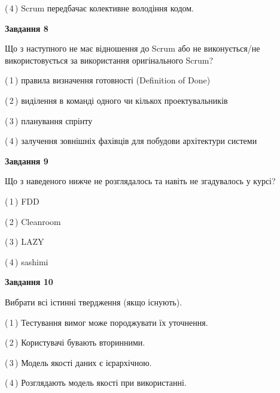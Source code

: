\documentclass[10pt, ukrainian]{article}
\begin{document}
{\begin {large}
(\,4\,) Scrum передбачає колективне володіння кодом. %


{\begin {center}\textbf{Завдання 8}\end {center}}\par
Що з наступного не має відношення до Scrum або не виконується/не використовується за використання оригінального Scrum?\par
\vspace{2mm}



(\,1\,) правила визначення готовності (Definition of Done) %



(\,2\,) виділення в команді одного чи кількох проектувальників%



(\,3\,) планування спрінту%



(\,4\,) залучення зовнішніх фахівців для побудови архітектури системи%


{\begin {center}\textbf{Завдання 9}\end {center}}\par
Що з наведеного нижче не розглядалось та навіть не згадувалось у курсі?\par
\vspace{2mm}



(\,1\,) FDD%



(\,2\,) Cleanroom%



(\,3\,) LAZY%



(\,4\,) sashimi%


{\begin {center}\textbf{Завдання 10}\end {center}}\par
Вибрати всі істинні твердження (якщо існують).\par
\vspace{2mm}



(\,1\,) Тестування вимог може породжувати їх уточнення.%



(\,2\,) Користувачі бувають вторинними.%



(\,3\,) Модель якості даних є ієрархічною.%



(\,4\,) Розглядають модель якості при використанні.%



\end {large}}
\end{document}
